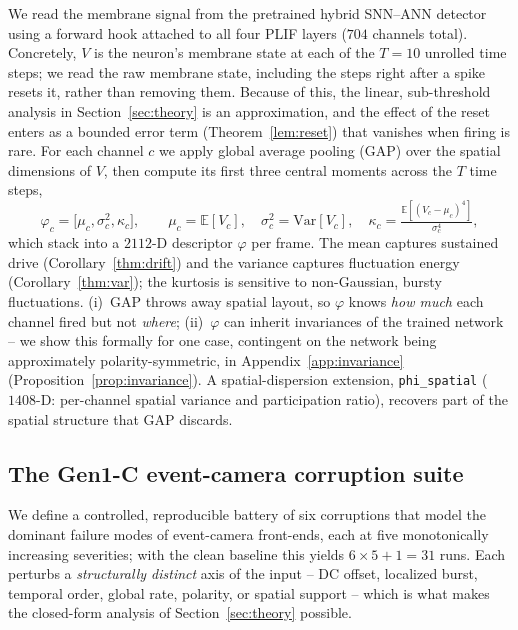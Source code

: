 ﻿\documentclass{article} %
\theoremstyle{remark}
\begin{document}
We read the membrane signal from the pretrained hybrid SNN--ANN detector using a forward hook
attached to all four PLIF layers ($704$ channels total). Concretely, $V$ is the neuron's membrane
state at each of the $T{=}10$ unrolled time steps; we read the raw membrane state, including the
steps right after a spike resets it, rather than removing them. Because of this, the linear,
sub-threshold analysis in Section~\ref{sec:theory} is an approximation, and the effect of the reset
enters as a bounded error term (Theorem~\ref{lem:reset}) that vanishes when firing is rare. For each
channel $c$ we apply global average pooling (GAP) over the spatial dimensions of $V$, then compute
its first three central moments across the $T$ time steps,
%
\begin{equation}
  \varphi_c = \big[\mu_c,\sigma_c^2,\kappa_c\big],\qquad
  \mu_c=\mathbb{E}[V_c],\quad \sigma_c^2=\mathrm{Var}[V_c],\quad
  \kappa_c=\tfrac{\mathbb{E}[(V_c-\mu_c)^4]}{\sigma_c^4},
  \label{eq:phi}
\end{equation}
%
which stack into a $2112$-D descriptor $\varphi$ per frame. The mean captures sustained drive
(Corollary~\ref{thm:drift}) and the variance captures fluctuation energy
(Corollary~\ref{thm:var}); the
kurtosis is sensitive to non-Gaussian, bursty fluctuations. (i)~GAP throws away spatial layout, so
$\varphi$ knows \emph{how much} each channel fired but not \emph{where}; (ii)~$\varphi$ can inherit
invariances of the trained
network -- we show this formally for one case, contingent on the network being approximately
polarity-symmetric, in Appendix~\ref{app:invariance} (Proposition~\ref{prop:invariance}). A
spatial-dispersion extension, \texttt{phi\_spatial} ($1408$-D: per-channel spatial variance and
participation ratio), recovers part of the spatial structure that GAP discards.

\subsection{The Gen1-C event-camera corruption suite}
\label{sec:corruptions}

We define a controlled, reproducible battery of six corruptions that model the dominant failure modes
of event-camera front-ends, each at five monotonically increasing severities; with the clean baseline
this yields $6\times5+1=31$ runs. Each perturbs a \emph{structurally distinct} axis of the input --
DC offset, localized burst, temporal order, global rate, polarity, or spatial support -- which is what
makes the closed-form analysis of Section~\ref{sec:theory} possible.
\end{document}
